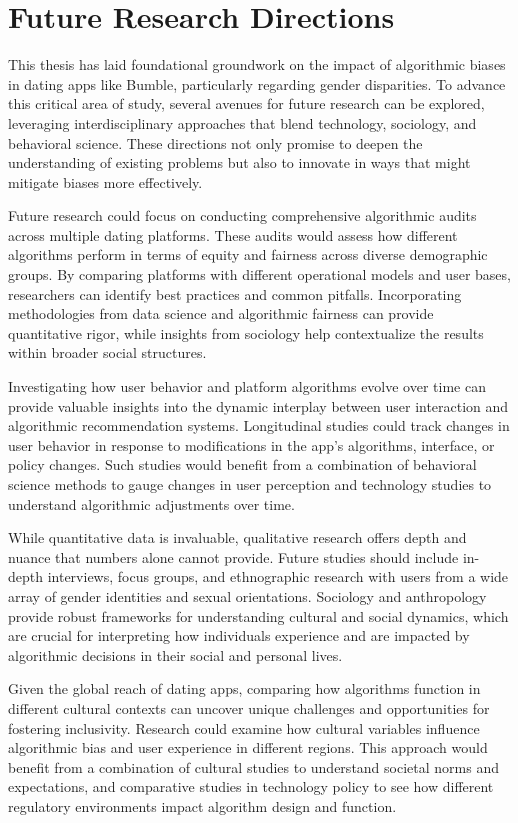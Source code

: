 \section{Future Research Directions}
This thesis has laid foundational groundwork on the impact of algorithmic biases in dating apps like Bumble, particularly regarding gender disparities. To advance this critical area of study, several avenues for future research can be explored, leveraging interdisciplinary approaches that blend technology, sociology, and behavioral science. These directions not only promise to deepen the understanding of existing problems but also to innovate in ways that might mitigate biases more effectively.

Future research could focus on conducting comprehensive algorithmic audits across multiple dating platforms. These audits would assess how different algorithms perform in terms of equity and fairness across diverse demographic groups. By comparing platforms with different operational models and user bases, researchers can identify best practices and common pitfalls. Incorporating methodologies from data science and algorithmic fairness can provide quantitative rigor, while insights from sociology help contextualize the results within broader social structures.

Investigating how user behavior and platform algorithms evolve over time can provide valuable insights into the dynamic interplay between user interaction and algorithmic recommendation systems. Longitudinal studies could track changes in user behavior in response to modifications in the app's algorithms, interface, or policy changes. Such studies would benefit from a combination of behavioral science methods to gauge changes in user perception and technology studies to understand algorithmic adjustments over time.

While quantitative data is invaluable, qualitative research offers depth and nuance that numbers alone cannot provide. Future studies should include in-depth interviews, focus groups, and ethnographic research with users from a wide array of gender identities and sexual orientations. Sociology and anthropology provide robust frameworks for understanding cultural and social dynamics, which are crucial for interpreting how individuals experience and are impacted by algorithmic decisions in their social and personal lives.

Given the global reach of dating apps, comparing how algorithms function in different cultural contexts can uncover unique challenges and opportunities for fostering inclusivity. Research could examine how cultural variables influence algorithmic bias and user experience in different regions. This approach would benefit from a combination of cultural studies to understand societal norms and expectations, and comparative studies in technology policy to see how different regulatory environments impact algorithm design and function.

